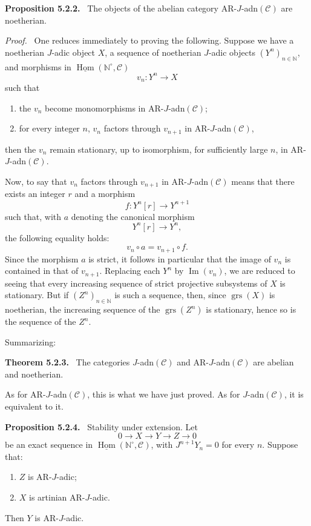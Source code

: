 \documentclass[11pt]{article}
\providecommand{\uHom}{\underline{\Hom}}
\newenvironment{statement}[1]{\par\medskip\noindent\textbf{#1.}\ }{\par\medskip}
\newenvironment{prooftext}[1][Proof]{\par\noindent\emph{#1.}\ }{\par\medskip}
\DeclareMathOperator{\Hom}{Hom}
\providecommand{\Hom}{\operatorname{Hom}}
\providecommand{\Im}{\operatorname{Im}}
\renewcommand{\Im}{\operatorname{Im}}
\providecommand{\grs}{\operatorname{grs}}
\providecommand{\Im}{\operatorname{Im}}
\providecommand{\Hom}{\operatorname{Hom}}
\begin{document}
\begin{statement}{Proposition 5.2.2}
The objects of the abelian category AR-\(J\)-adn\((\mathcal C)\) are noetherian.
\end{statement}

\begin{prooftext}
One reduces immediately to proving the following. Suppose we have a noetherian \(J\)-adic object \(X\), a sequence of noetherian \(J\)-adic objects \((Y^n)_{n\in\mathbb N}\), and morphisms in \(\uHom(\mathbb N^\circ,\mathcal C)\)
\[
v_n:Y^n\longrightarrow X
\]
such that
\begin{enumerate}[label=\textup{(\roman*)}]
\item the \(v_n\) become monomorphisms in AR-\(J\)-adn\((\mathcal C)\);
\item for every integer \(n\), \(v_n\) factors through \(v_{n+1}\) in AR-\(J\)-adn\((\mathcal C)\),
\end{enumerate}
then the \(v_n\) remain stationary, up to isomorphism, for sufficiently large \(n\), in AR-\(J\)-adn\((\mathcal C)\).

Now, to say that \(v_n\) factors through \(v_{n+1}\) in AR-\(J\)-adn\((\mathcal C)\) means that there exists an integer \(r\) and a morphism
\[
f:Y^n[r]\longrightarrow Y^{n+1}
\]
such that, with \(a\) denoting the canonical morphism
\[
Y^n[r]\longrightarrow Y^n,
\]
the following equality holds:
\[
v_n\circ a=v_{n+1}\circ f .
\]
Since the morphism \(a\) is strict, it follows in particular that the image of \(v_n\) is contained in that of \(v_{n+1}\). Replacing each \(Y^n\) by \(\Im(v_n)\), we are reduced to seeing that every increasing sequence of strict projective subsystems of \(X\) is stationary. But if \((Z^n)_{n\in\mathbb N}\) is such a sequence, then, since \(\grs(X)\) is noetherian, the increasing sequence of the \(\grs(Z^n)\) is stationary, hence so is the sequence of the \(Z^n\).
\end{prooftext}

Summarizing:

\begin{statement}{Theorem 5.2.3}
The categories \(J\)-adn\((\mathcal C)\) and AR-\(J\)-adn\((\mathcal C)\) are abelian and noetherian.
\end{statement}

As for AR-\(J\)-adn\((\mathcal C)\), this is what we have just proved. As for \(J\)-adn\((\mathcal C)\), it is equivalent to it.

\begin{statement}{Proposition 5.2.4}
Stability under extension. Let
\[
0\longrightarrow X\longrightarrow Y\longrightarrow Z\longrightarrow0
\]
be an exact sequence in \(\uHom(\mathbb N^\circ,\mathcal C)\), with \(J^{n+1}Y_n=0\) for every \(n\). Suppose that:
\begin{enumerate}[label=\textup{(\roman*)}]
\item \(Z\) is AR-\(J\)-adic;
\item \(X\) is artinian AR-\(J\)-adic.
\end{enumerate}
Then \(Y\) is AR-\(J\)-adic.
\end{statement}
\end{document}
